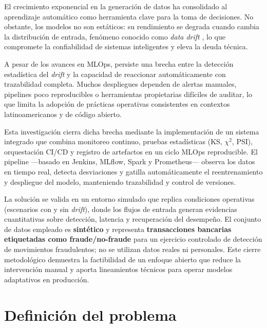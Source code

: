 
El crecimiento exponencial en la generación de datos ha consolidado al aprendizaje automático como herramienta clave para la toma de decisiones. No obstante, los modelos no son estáticos: su rendimiento se degrada cuando cambia la distribución de entrada, fenómeno conocido como \textit{data drift} \citep{Sculley2015}, lo que compromete la confiabilidad de sistemas inteligentes y eleva la deuda técnica.

A pesar de los avances en MLOps, persiste una brecha entre la detección estadística del \textit{drift} y la capacidad de reaccionar automáticamente con trazabilidad completa. Muchos despliegues dependen de alertas manuales, pipelines poco reproducibles o herramientas propietarias difíciles de auditar, lo que limita la adopción de prácticas operativas consistentes en contextos latinoamericanos y de código abierto.

Esta investigación cierra dicha brecha mediante la implementación de un sistema integrado que combina monitoreo continuo, pruebas estadísticas (KS, $\chi^2$, PSI), orquestación CI/CD y registro de artefactos en un ciclo MLOps reproducible. El pipeline —basado en Jenkins, MLflow, Spark y Prometheus— observa los datos en tiempo real, detecta desviaciones y gatilla automáticamente el reentrenamiento y despliegue del modelo, manteniendo trazabilidad y control de versiones.

La solución se valida en un entorno simulado que replica condiciones operativas (escenarios con y sin \textit{drift}), donde los flujos de entrada generan evidencias cuantitativas sobre detección, latencia y recuperación del desempeño. El conjunto de datos empleado es \textbf{sintético} y representa \textbf{transacciones bancarias etiquetadas como fraude/no-fraude} para un ejercicio controlado de detección de movimientos fraudulentos; no se utilizan datos reales ni personales. Este cierre metodológico demuestra la factibilidad de un enfoque abierto que reduce la intervención manual y aporta lineamientos técnicos para operar modelos adaptativos en producción.

\section{Definición del problema}
